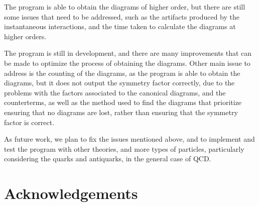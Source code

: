 \documentclass[11pt,a4paper,twoside,pdf]{article}
\numberwithin{equation}{section}
\begin{document}
The program is able to obtain the diagrams of higher order, but there are still
some issues that need to be addressed, such as the artifacts produced by the
instantaneous interactions, and the time taken to calculate the diagrams at higher
orders. 

The program is still in development, and there are many improvements that can
be made to optimize the process of obtaining the diagrams. Other main issue to 
address is the counting of the diagrams, as the program is able to obtain the diagrams, 
but it does not output the symmetry factor correctly, due to the problems with the factors 
associated to the canonical diagrams, and the counterterms, as well as the method
used to find the diagrams that prioritize ensuring that no diagrams are lost, rather than
ensuring that the symmetry factor is correct.

As future work, we plan to fix the issues mentioned above, and to implement and 
test the program with other theories, and more types of particles, particularly
considering the quarks and antiquarks, in the general case of QCD. 

\section{Acknowledgements}

\newpage

\end{document}
